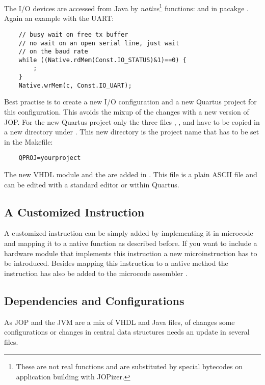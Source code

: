 The I/O devices are accessed from Java by
\emph{native}\footnote{These are not real functions and are
substituted by special bytecodes on application building with
JOPizer.} functions:  and 
in pacakge . Again an example with the UART:

\begin{lstlisting}
    // busy wait on free tx buffer
    // no wait on an open serial line, just wait
    // on the baud rate
    while ((Native.rdMem(Const.IO_STATUS)&1)==0) {
        ;
    }
    Native.wrMem(c, Const.IO_UART);
\end{lstlisting}

Best practise is to create a new I/O configuration
 and a new Quartus project for this
configuration. This avoids the mixup of the changes with a new
version of JOP. For the new Quartus project only the three files
, , and  have to be copied
in a new directory under . This new directory is the
project name that has to be set in the Makefile:

\begin{lstlisting}
    QPROJ=yourproject
\end{lstlisting}

The new VHDL module and the  are added in
. This file is a plain ASCII file and can be edited
with a standard editor or within Quartus.

\subsection{A Customized Instruction}

A customized instruction can be simply added by implementing it in
microcode and mapping it to a native function as described before. If
you want to include a hardware module that implements this
instruction a new microinstruction has to be introduced. Besides
mapping this instruction to a native method the instruction has also
be added to the microcode assembler .

\subsection{Dependencies and Configurations}

As JOP and the JVM are a mix of VHDL and Java files, of changes some
configurations or changes in central data structures needs an update
in several files.

